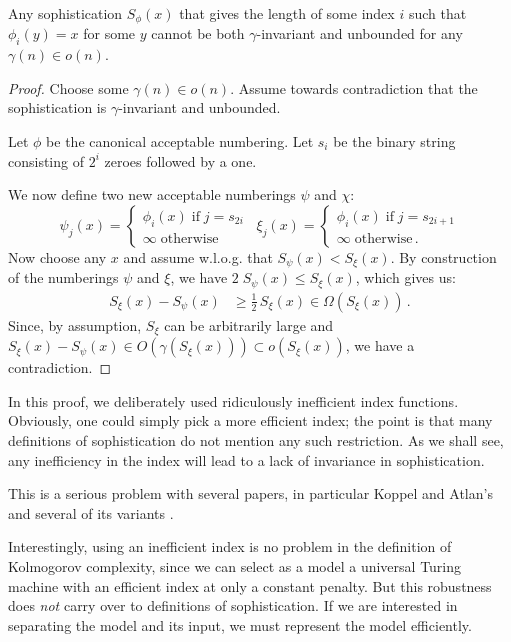 \documentclass{style/llncs}
\newcommand{\s}{S}
\newcommand{\p}{\,\text{.}}
\begin{document}
\begin{lemma}
Any sophistication $\s_\phi(x)$ that gives the length of some index $i$ such that $\phi_i(y) = x$ for some $y$ cannot be both $\gamma$-invariant and unbounded for any $\gamma(n) \in o(n)$.
\end{lemma}
\begin{proof}
Choose some $\gamma(n) \in o(n)$. Assume towards contradiction that the sophistication is $\gamma$-invariant and unbounded.

Let $\phi$ be the canonical acceptable numbering. Let $s_i$ be the binary string consisting of $2^{i}$ zeroes followed by a one.

We now define two new acceptable numberings $\psi$ and $\chi$:
\[
\psi_j(x) = \begin{cases}
	\phi_i(x) \;\text{if}\; j = s_{2i}\\
	\infty\;\text{otherwise}
\end{cases}\,\,\,
\xi_j(x) = 
\begin{cases}
	\phi_i(x) \;\text{if}\; j = s_{2i+1} \\
	\infty \;\text{otherwise}\p
\end{cases}
\]
Now choose any $x$ and assume w.l.o.g. that $\s_\psi(x) < \s_\xi(x)$. By construction of the numberings $\psi$ and $\xi$, we have $2\;\s_\psi(x)  \leq \s_\xi(x)$, which gives us:
\begin{align*}
	\s_\xi(x) - \s_\psi(x) &\geq \frac{1}{2}\, \s_\xi(x)  \in \Omega(\s_\xi(x))\p 
\end{align*}
Since, by assumption, $\s_\xi$ can be arbitrarily large and $\s_\xi(x) - \s_\psi(x) \in O(\gamma(\s_\xi(x))) \subset o(\s_\xi(x))$, we have a contradiction.
\end{proof}
In this proof, we deliberately used ridiculously inefficient index functions. Obviously, one could simply pick a more efficient index; the point is that many definitions of sophistication do not mention any such restriction. As we shall see, any inefficiency in the index will lead to a lack of invariance in sophistication.

This is a serious problem with several papers, in particular
Koppel and Atlan's \cite{koppelSoph1988,koppel1991almost} and several of its variants \cite{antunes2009sophistication,antunes2013sophistication}. 

Interestingly, using an inefficient index is no problem in the definition of Kolmogorov complexity, since we can select as a model a universal Turing machine with an efficient index at only a constant penalty. But this robustness does \emph{not} carry over to definitions of sophistication. If we are interested in separating the model and its input, we must represent the model efficiently. 
\end{document}
